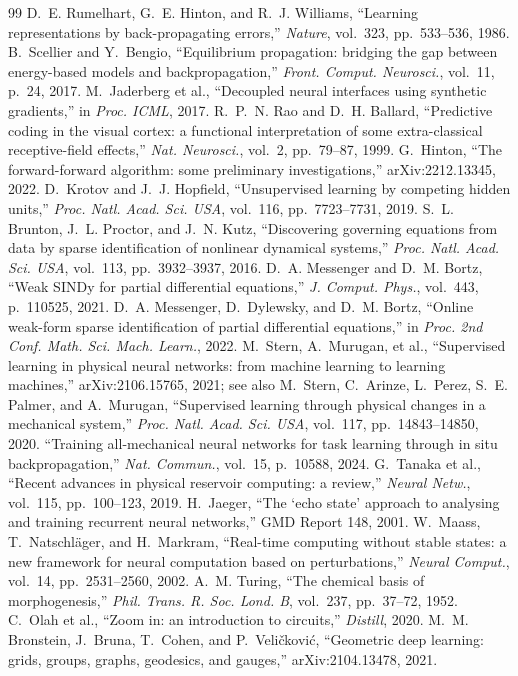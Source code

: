 \documentclass[conference]{IEEEtran}
\begin{document}
\begin{thebibliography}{99}
 D.~E. Rumelhart, G.~E. Hinton, and R.~J. Williams, ``Learning
representations by back-propagating errors,'' \emph{Nature}, vol.~323, pp.~533--536,
1986.
 B.~Scellier and Y.~Bengio, ``Equilibrium propagation: bridging the gap
between energy-based models and backpropagation,'' \emph{Front. Comput. Neurosci.},
vol.~11, p.~24, 2017.
 M.~Jaderberg et al., ``Decoupled neural interfaces using synthetic
gradients,'' in \emph{Proc. ICML}, 2017.
 R.~P.~N. Rao and D.~H. Ballard, ``Predictive coding in the visual
cortex: a functional interpretation of some extra-classical receptive-field
effects,'' \emph{Nat. Neurosci.}, vol.~2, pp.~79--87, 1999.
 G.~Hinton, ``The forward-forward algorithm: some preliminary
investigations,'' arXiv:2212.13345, 2022.
 D.~Krotov and J.~J. Hopfield, ``Unsupervised learning by competing
hidden units,'' \emph{Proc. Natl. Acad. Sci. USA}, vol.~116, pp.~7723--7731, 2019.
 S.~L. Brunton, J.~L. Proctor, and J.~N. Kutz, ``Discovering
governing equations from data by sparse identification of nonlinear dynamical
systems,'' \emph{Proc. Natl. Acad. Sci. USA}, vol.~113, pp.~3932--3937, 2016.
 D.~A. Messenger and D.~M. Bortz, ``Weak SINDy for partial
differential equations,'' \emph{J. Comput. Phys.}, vol.~443, p.~110525, 2021.
 D.~A. Messenger, D.~Dylewsky, and D.~M. Bortz, ``Online weak-form
sparse identification of partial differential equations,'' in \emph{Proc. 2nd Conf.
Math. Sci. Mach. Learn.}, 2022.
 M.~Stern, A.~Murugan, et al., ``Supervised learning in physical
neural networks: from machine learning to learning machines,'' arXiv:2106.15765,
2021; see also M.~Stern, C.~Arinze, L.~Perez, S.~E. Palmer, and A.~Murugan,
``Supervised learning through physical changes in a mechanical system,'' \emph{Proc.
Natl. Acad. Sci. USA}, vol.~117, pp.~14843--14850, 2020.
 ``Training all-mechanical neural networks for task learning through in
situ backpropagation,'' \emph{Nat. Commun.}, vol.~15, p.~10588, 2024.
 G.~Tanaka et al., ``Recent advances in physical reservoir
computing: a review,'' \emph{Neural Netw.}, vol.~115, pp.~100--123, 2019.
 H.~Jaeger, ``The `echo state' approach to analysing and training
recurrent neural networks,'' GMD Report 148, 2001.
 W.~Maass, T.~Natschl\"ager, and H.~Markram, ``Real-time computing
without stable states: a new framework for neural computation based on
perturbations,'' \emph{Neural Comput.}, vol.~14, pp.~2531--2560, 2002.
 A.~M. Turing, ``The chemical basis of morphogenesis,''
\emph{Phil. Trans. R. Soc. Lond. B}, vol.~237, pp.~37--72, 1952.
 C.~Olah et al., ``Zoom in: an introduction to circuits,''
\emph{Distill}, 2020.
 M.~M. Bronstein, J.~Bruna, T.~Cohen, and P.~Veli\v{c}kovi\'c,
``Geometric deep learning: grids, groups, graphs, geodesics, and gauges,''
arXiv:2104.13478, 2021.


\end{thebibliography}
\end{document}
